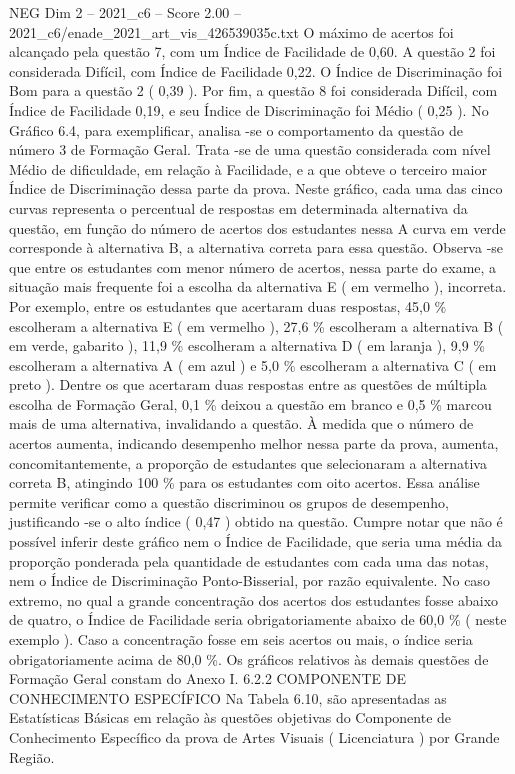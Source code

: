 \begin{textsample}{NEG Dim 2 – 2021\_c6 – Score 2.00 – 2021\_c6/enade\_2021\_art\_vis\_426539035c.txt}
O máximo de acertos foi alcançado pela questão 7, com um Índice de Facilidade de 0,60.
A questão 2 foi considerada Difícil, com Índice de Facilidade 0,22.
O Índice de Discriminação foi Bom para a questão 2 ( 0,39 ).
Por fim, a questão 8 foi considerada Difícil, com Índice de Facilidade 0,19, e seu Índice de Discriminação foi Médio ( 0,25 ).
No Gráfico 6.4, para exemplificar, analisa -se o comportamento da questão de número 3 de Formação Geral.
Trata -se de uma questão considerada com nível Médio de dificuldade, em relação à Facilidade, e a que obteve o terceiro maior Índice de Discriminação dessa parte da prova.
Neste gráfico, cada uma das cinco curvas representa o percentual de respostas em determinada alternativa da questão, em função do número de acertos dos estudantes nessa A curva em verde corresponde à alternativa B, a alternativa correta para essa questão.
Observa -se que entre os estudantes com menor número de acertos, nessa parte do exame, a situação mais frequente foi a escolha da alternativa E ( em vermelho ), incorreta.
Por exemplo, entre os estudantes que acertaram duas respostas, 45,0 \% escolheram a alternativa E ( em vermelho ), 27,6 \% escolheram a alternativa B ( em verde, gabarito ), 11,9 \% escolheram a alternativa D ( em laranja ), 9,9 \% escolheram a alternativa A ( em azul ) e 5,0 \% escolheram a alternativa C ( em preto ).
Dentre os que acertaram duas respostas entre as questões de múltipla escolha de Formação Geral, 0,1 \% deixou a questão em branco e 0,5 \% marcou mais de uma alternativa, invalidando a questão.
À medida que o número de acertos aumenta, indicando desempenho melhor nessa parte da prova, aumenta, concomitantemente, a proporção de estudantes que selecionaram a alternativa correta B, atingindo 100 \% para os estudantes com oito acertos.
Essa análise permite verificar como a questão discriminou os grupos de desempenho, justificando -se o alto índice ( 0,47 ) obtido na questão.
Cumpre notar que não é possível inferir deste gráfico nem o Índice de Facilidade, que seria uma média da proporção ponderada pela quantidade de estudantes com cada uma das notas, nem o Índice de Discriminação Ponto-Bisserial, por razão equivalente.
No caso extremo, no qual a grande concentração dos acertos dos estudantes fosse abaixo de quatro, o Índice de Facilidade seria obrigatoriamente abaixo de 60,0 \% ( neste exemplo ).
Caso a concentração fosse em seis acertos ou mais, o índice seria obrigatoriamente acima de 80,0 \%.
Os gráficos relativos às demais questões de Formação Geral constam do Anexo I. 6.2.2 COMPONENTE DE CONHECIMENTO ESPECÍFICO Na Tabela 6.10, são apresentadas as Estatísticas Básicas em relação às questões objetivas do Componente de Conhecimento Específico da prova de Artes Visuais ( Licenciatura ) por Grande Região.

\end{textsample}
